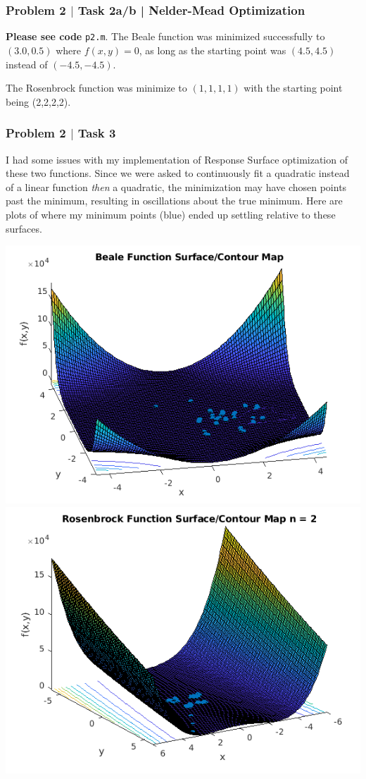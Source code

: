 \documentclass[aspectratio=1610]{beamer}
\begin{document}
\begin{frame}[fragile]
\frametitle{Problem 2 $|$ Task 2a/b | Nelder-Mead Optimization}

\textbf{Please see code} \verb|p2.m|. The Beale function was minimized successfully to $(3.0, 0.5)$ where $f(x,y) = 0$, as long as the starting point was $(4.5 , 4.5)$ instead of  $(-4.5 , -4.5)$.

The Rosenbrock function was minimize to $(1,1,1,1)$ with the starting point being (2,2,2,2). 
 
\end{frame}

\begin{frame}[fragile]
\frametitle{Problem 2 $|$ Task 3}

\small{I had some issues with my implementation of Response Surface optimization of these two functions. Since we were asked to continuously fit a quadratic instead of a linear function \textit{then} a quadratic, the minimization may have chosen points past the minimum, resulting in oscillations about the true minimum. Here are plots of where my minimum points (blue) ended up settling relative to these surfaces.}

\vspace{1em}
\centering
\includegraphics[width = .49\textwidth]{2_beale_rsm}
\includegraphics[width = .49\textwidth]{2_rbrock_rsm}
\end{frame}
\end{document}
